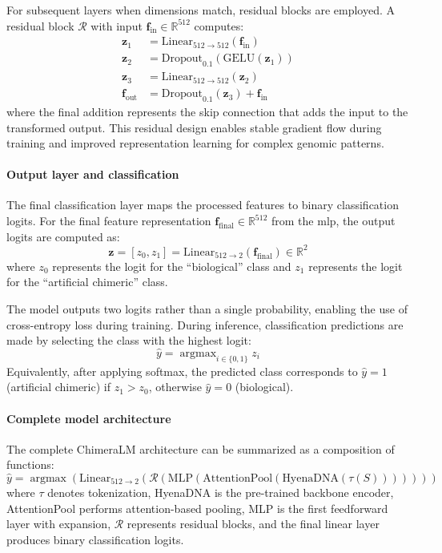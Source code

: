 \documentclass[pdflatex,sn-nature]{sn-jnl}%
\DeclareMathOperator*{\argmax}{argmax}
\theoremstyle{thmstyleone}%
\theoremstyle{thmstyletwo}%
\theoremstyle{thmstylethree}%
\begin{document}
For subsequent layers when dimensions match, residual blocks are employed.
A residual block $\mathcal{R}$ with input $\mathbf{f}_{\text{in}} \in \mathbb{R}^{512}$ computes:
\begin{align*}
	\mathbf{z}_1            & = \text{Linear}_{512 \to 512}(\mathbf{f}_{\text{in}})         \\
	\mathbf{z}_2            & = \text{Dropout}_{0.1}(\text{GELU}(\mathbf{z}_1))             \\
	\mathbf{z}_3            & = \text{Linear}_{512 \to 512}(\mathbf{z}_2)                   \\
	\mathbf{f}_{\text{out}} & = \text{Dropout}_{0.1}(\mathbf{z}_3) + \mathbf{f}_{\text{in}}
\end{align*}
where the final addition represents the skip connection that adds the input to the transformed output.
This residual design enables stable gradient flow during training and improved representation learning for complex genomic patterns.

\paragraph{Output layer and classification}
The final classification layer maps the processed features to binary classification logits.
For the final feature representation $\mathbf{f}_{\text{final}} \in \mathbb{R}^{512}$ from the \gls{mlp}, the output logits are computed as:
$$
	\mathbf{z} = [z_0, z_1] = \text{Linear}_{512 \to 2}(\mathbf{f}_{\text{final}}) \in \mathbb{R}^{2}
$$
where $z_0$ represents the logit for the ``biological'' class and $z_1$ represents the logit for the ``artificial chimeric'' class.

The model outputs two logits rather than a single probability, enabling the use of cross-entropy loss during training.
During inference, classification predictions are made by selecting the class with the highest logit:
$$
	\hat{y} = \argmax_{i \in \{0,1\}} z_i
$$
Equivalently, after applying softmax, the predicted class corresponds to $\hat{y} = 1$ (artificial chimeric) if $z_1 > z_0$, otherwise $\hat{y} = 0$ (biological).

\paragraph{Complete model architecture}
The complete ChimeraLM architecture can be summarized as a composition of functions:
$$
	\hat{y} = \argmax(\text{Linear}_{512 \to 2}(\mathcal{R}(\text{MLP}(\text{AttentionPool}(\text{HyenaDNA}(\tau(S)))))))
$$
where $\tau$ denotes tokenization, HyenaDNA is the pre-trained backbone encoder, AttentionPool performs attention-based pooling, MLP is the first feedforward layer with expansion, $\mathcal{R}$ represents residual blocks, and the final linear layer produces binary classification logits.
\end{document}
